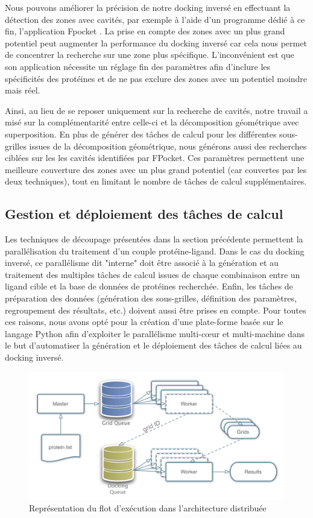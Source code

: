 Nous pouvons améliorer la précision de notre docking inversé en effectuant la détection des zones avec cavités, par exemple à l'aide d'un programme dédié à ce fin, l'application Fpocket \cite{Guilloux09a}. La prise en compte des zones avec un plus grand potentiel peut augmenter la performance du docking inversé car cela nous permet de concentrer la recherche sur une zone plus spécifique. L'inconvénient est que son application nécessite un réglage fin des paramètres afin d'inclure les spécificités des protéines et de ne pas exclure des zones avec un potentiel moindre mais réel. 

Ainsi, au lieu de se reposer uniquement sur la recherche de cavités, notre travail a misé sur la complémentarité entre celle-ci et la décomposition géométrique avec superposition. En plus de générer des tâches de calcul pour les différentes sous-grilles issues de la décomposition géométrique, nous générons aussi des recherches ciblées sur les les cavités identifiées par FPocket. Ces paramètres permettent une meilleure couverture des zones avec un plus grand potentiel (car couvertes par les deux techniques), tout en limitant le nombre de tâches de calcul supplémentaires.


\subsection{Gestion et déploiement des tâches de calcul}

Les techniques de découpage présentées dans la section précédente permettent la parallélisation du traitement d'un couple protéine-ligand. Dans le cas du docking inversé, ce parallélisme dit "interne" doit être associé à la génération et au traitement des multiples tâches de calcul issues de chaque combinaison entre un ligand cible et la base de données de protéines recherchée. Enfin, les tâches de préparation des données (génération des sous-grilles, définition des paramètres, regroupement des résultats, etc.) doivent aussi être prises en compte. Pour toutes ces raisons, nous avons opté pour la création d'une plate-forme basée sur le langage Python afin d'exploiter le parallélisme multi-c{\oe}ur et multi-machine dans le but d'automatiser la génération et le déploiement des tâches de calcul liées au docking inversé.


\begin{figure}
	\begin{center}
		\includegraphics[width=0.5\linewidth]{images/Romain/fig3-color}
	\end{center}
	\caption{Représentation du flot d'exécution dans l'architecture distribuée}\label{fig:romain-fig3}
\end{figure}


